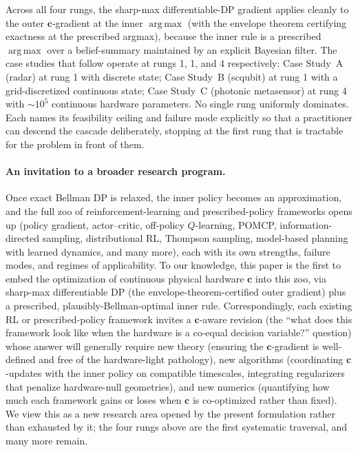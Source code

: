 \documentclass[11pt,a4paper,onecolumn]{article}
\newcommand{\argmax}{\operatorname*{arg\,max}}
\newcommand{\bc}{\bm{c}}
\begin{document}
Across all four rungs, the sharp-max differentiable-DP gradient applies cleanly to the outer $\bc$-gradient at the inner $\argmax$ (with the envelope theorem certifying exactness at the prescribed argmax), because the inner rule is a prescribed $\argmax$ over a belief-summary maintained by an explicit Bayesian filter.  The case studies that follow operate at rungs 1, 1, and 4 respectively: Case Study~A (radar) at rung 1 with discrete state; Case Study~B (scqubit) at rung 1 with a grid-discretized continuous state; Case Study~C (photonic metasensor) at rung 4 with $\sim 10^5$ continuous hardware parameters.  No single rung uniformly dominates.  Each names its feasibility ceiling and failure mode explicitly so that a practitioner can descend the cascade deliberately, stopping at the first rung that is tractable for the problem in front of them.

\paragraph{An invitation to a broader research program.}
Once exact Bellman DP is relaxed, the inner policy becomes an approximation, and the full zoo of reinforcement-learning and prescribed-policy frameworks opens up (policy gradient, actor--critic, off-policy $Q$-learning, POMCP, information-directed sampling, distributional RL, Thompson sampling, model-based planning with learned dynamics, and many more), each with its own strengths, failure modes, and regimes of applicability.  To our knowledge, this paper is the first to embed the optimization of continuous physical hardware $\bc$ into this zoo, via sharp-max differentiable DP (the envelope-theorem-certified outer gradient) plus a prescribed, plausibly-Bellman-optimal inner rule.  Correspondingly, each existing RL or prescribed-policy framework invites a $\bc$-aware revision (the ``what does this framework look like when the hardware is a co-equal decision variable?'' question) whose answer will generally require new theory (ensuring the $\bc$-gradient is well-defined and free of the hardware-light pathology), new algorithms (coordinating $\bc$-updates with the inner policy on compatible timescales, integrating regularizers that penalize hardware-null geometries), and new numerics (quantifying how much each framework gains or loses when $\bc$ is co-optimized rather than fixed).  We view this as a new research area opened by the present formulation rather than exhausted by it; the four rungs above are the first systematic traversal, and many more remain.
\end{document}
